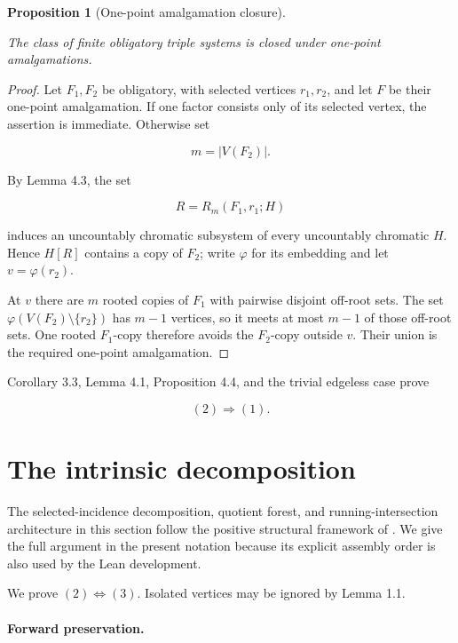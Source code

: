\documentclass[a4paper,11pt,reqno]{amsart}
\theoremstyle{plain}
\newtheorem{proposition}[theorem]{Proposition}
\theoremstyle{definition}
\theoremstyle{remark}
\begin{document}
\begin{proposition}[One-point amalgamation closure]\label{proposition-4.4-one-point-amalgamation-closure}

The class of finite obligatory triple systems is closed under one-point amalgamations.

\end{proposition}
\begin{proof}
Let \(F_1,F_2\) be obligatory, with selected vertices \(r_1,r_2\), and let \(F\) be their one-point amalgamation. If one factor consists only of its selected vertex, the assertion is immediate. Otherwise set

\[
m=|V(F_2)|.
\]

By Lemma 4.3, the set

\[
R=R_m(F_1,r_1;H)
\]

induces an uncountably chromatic subsystem of every uncountably chromatic \(H\). Hence \(H[R]\) contains a copy of \(F_2\); write \(\varphi\) for its embedding and let \(v=\varphi(r_2)\).

At \(v\) there are \(m\) rooted copies of \(F_1\) with pairwise disjoint off-root sets. The set \(\varphi(V(F_2)\setminus\{r_2\})\) has \(m-1\) vertices, so it meets at most \(m-1\) of those off-root sets. One rooted \(F_1\)-copy therefore avoids the \(F_2\)-copy outside \(v\). Their union is the required one-point amalgamation.
\end{proof}

Corollary 3.3, Lemma 4.1, Proposition 4.4, and the trivial edgeless case prove

\[
(2)\Longrightarrow(1). \tag{4.1}
\]

\section{The intrinsic decomposition}\label{equivalence-of-the-constructive-and-intrinsic-descriptions}

The selected-incidence decomposition, quotient forest, and running-intersection
architecture in this section follow the positive structural framework of
\citet[Sections~4--5]{li2026}.  We give the full argument in the present
notation because its explicit assembly order is also used by the Lean
development.

We prove \((2)\Longleftrightarrow(3)\). Isolated vertices may be ignored by Lemma 1.1.

\paragraph{Forward preservation.}\label{forward-preservation}
\end{document}
